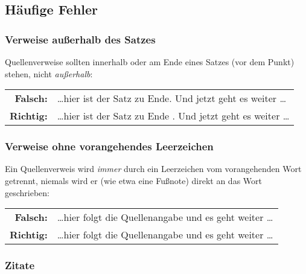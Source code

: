 \subsection{Häufige Fehler}

\subsubsection{Verweise außerhalb des Satzes}
Quellenverweise sollten innerhalb oder am Ende eines Satzes (\dah vor dem Punkt) stehen, nicht \emph{außerhalb}:
%
\begin{center}
\begin{tabular}{rl}
 \textbf{Falsch:}  & \ldots hier ist der Satz zu Ende. \cite{Oetiker2021} Und jetzt geht es weiter \ldots \\
 \textbf{Richtig:} & \ldots hier ist der Satz zu Ende \cite{Oetiker2021}. Und jetzt geht es weiter \ldots
\end{tabular}
\end{center}

\subsubsection{Verweise ohne vorangehendes Leerzeichen}

Ein Quellenverweis wird \emph{immer} durch ein Leerzeichen vom vorangehenden Wort getrennt, 
niemals wird er (wie etwa eine Fußnote) direkt an das Wort geschrieben:
%
\begin{center}
\begin{tabular}{rl}
\textbf{Falsch:}  & \ldots hier folgt die Quellenangabe\cite{Oetiker2021} und es geht weiter \ldots \\
\textbf{Richtig:} & \ldots hier folgt die Quellenangabe \cite{Oetiker2021} und es geht weiter \ldots
\end{tabular}
\end{center}

\subsubsection{Zitate}

